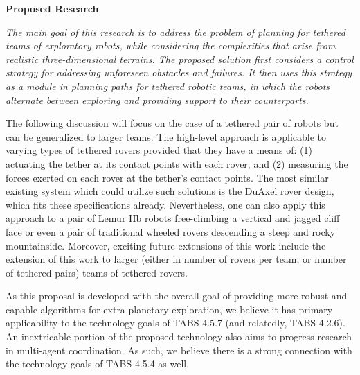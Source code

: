 \documentclass[12pt]{article}
\begin{document}


{\bf\noindent Proposed Research}

{\sl The main goal of this research is to address the problem of
  planning for tethered teams of exploratory robots, while considering
  the complexities that arise from realistic three-dimensional
  terrains.  The proposed solution first considers a control strategy
  for addressing unforeseen obstacles and failures. It then uses this
  strategy as a module in planning paths for tethered robotic teams,
  in which the robots alternate between exploring and providing
  support to their counterparts.}

The following discussion will focus on the case of a tethered pair of
robots but can be generalized to larger teams. The high-level approach
is applicable to varying types of tethered rovers provided that they
have a means of: (1) actuating the tether at its contact points with
each rover, and (2) measuring the forces exerted on each rover at the
tether's contact points. The most similar existing system which could
utilize such solutions is the DuAxel rover design, which fits these
specifications already. Nevertheless, one can also apply this approach
to a pair of Lemur IIb robots free-climbing a vertical and jagged
cliff face or even a pair of traditional wheeled rovers descending a
steep and rocky mountainside. Moreover, exciting future extensions of this 
work include the extension of this work to larger (either in number of 
rovers per team, or number of tethered pairs) teams of tethered rovers.  

As this proposal is developed with the overall goal of providing more robust and 
capable algorithms for extra-planetary exploration, we believe it has primary 
applicability to the technology goals of TABS 4.5.7 (and relatedly, TABS 4.2.6). 
An inextricable portion of the proposed technology also aims to progress 
research in multi-agent coordination. As such, we believe there is a strong 
connection with the technology goals of TABS 4.5.4 as well.  

\end{document}
